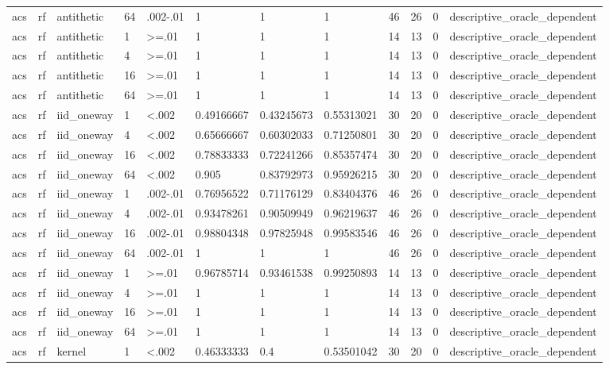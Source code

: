 \begin{tabular}{llllllllllll}
acs & rf & antithetic & 64 & .002-.01 & 1 & 1 & 1 & 46 & 26 & 0 & descriptive\_oracle\_dependent \\
acs & rf & antithetic & 1 & >=.01 & 1 & 1 & 1 & 14 & 13 & 0 & descriptive\_oracle\_dependent \\
acs & rf & antithetic & 4 & >=.01 & 1 & 1 & 1 & 14 & 13 & 0 & descriptive\_oracle\_dependent \\
acs & rf & antithetic & 16 & >=.01 & 1 & 1 & 1 & 14 & 13 & 0 & descriptive\_oracle\_dependent \\
acs & rf & antithetic & 64 & >=.01 & 1 & 1 & 1 & 14 & 13 & 0 & descriptive\_oracle\_dependent \\
acs & rf & iid\_oneway & 1 & <.002 & 0.49166667 & 0.43245673 & 0.55313021 & 30 & 20 & 0 & descriptive\_oracle\_dependent \\
acs & rf & iid\_oneway & 4 & <.002 & 0.65666667 & 0.60302033 & 0.71250801 & 30 & 20 & 0 & descriptive\_oracle\_dependent \\
acs & rf & iid\_oneway & 16 & <.002 & 0.78833333 & 0.72241266 & 0.85357474 & 30 & 20 & 0 & descriptive\_oracle\_dependent \\
acs & rf & iid\_oneway & 64 & <.002 & 0.905 & 0.83792973 & 0.95926215 & 30 & 20 & 0 & descriptive\_oracle\_dependent \\
acs & rf & iid\_oneway & 1 & .002-.01 & 0.76956522 & 0.71176129 & 0.83404376 & 46 & 26 & 0 & descriptive\_oracle\_dependent \\
acs & rf & iid\_oneway & 4 & .002-.01 & 0.93478261 & 0.90509949 & 0.96219637 & 46 & 26 & 0 & descriptive\_oracle\_dependent \\
acs & rf & iid\_oneway & 16 & .002-.01 & 0.98804348 & 0.97825948 & 0.99583546 & 46 & 26 & 0 & descriptive\_oracle\_dependent \\
acs & rf & iid\_oneway & 64 & .002-.01 & 1 & 1 & 1 & 46 & 26 & 0 & descriptive\_oracle\_dependent \\
acs & rf & iid\_oneway & 1 & >=.01 & 0.96785714 & 0.93461538 & 0.99250893 & 14 & 13 & 0 & descriptive\_oracle\_dependent \\
acs & rf & iid\_oneway & 4 & >=.01 & 1 & 1 & 1 & 14 & 13 & 0 & descriptive\_oracle\_dependent \\
acs & rf & iid\_oneway & 16 & >=.01 & 1 & 1 & 1 & 14 & 13 & 0 & descriptive\_oracle\_dependent \\
acs & rf & iid\_oneway & 64 & >=.01 & 1 & 1 & 1 & 14 & 13 & 0 & descriptive\_oracle\_dependent \\
acs & rf & kernel & 1 & <.002 & 0.46333333 & 0.4 & 0.53501042 & 30 & 20 & 0 & descriptive\_oracle\_dependent \\

\end{tabular}
